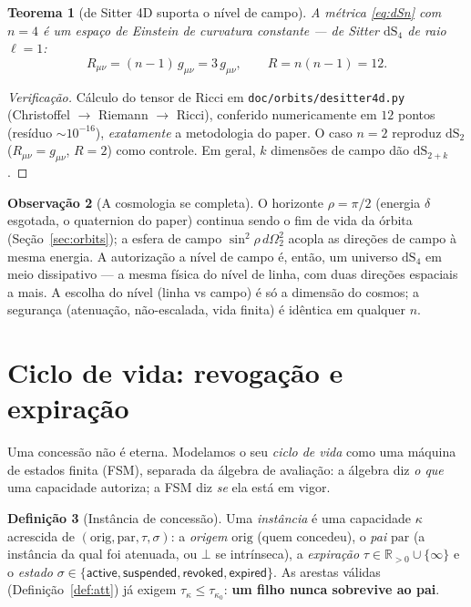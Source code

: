 \documentclass[11pt,a4paper]{article}
\newtheorem{theorem}{Teorema}
\theoremstyle{definition}
\newtheorem{definition}[theorem]{Definição}
\newtheorem{remark}[theorem]{Observação}
\newcommand{\dep}{\delta}
\newcommand{\dS}{\mathrm{dS}}
\begin{document}
\begin{theorem}[de Sitter 4D suporta o nível de campo]\label{thm:dS4}
A métrica \eqref{eq:dSn} com $n=4$ é um espaço de Einstein de curvatura
constante --- de Sitter $\dS_4$ de raio $\ell=1$:
\[
  R_{\mu\nu}=(n-1)\,g_{\mu\nu}=3\,g_{\mu\nu},\qquad R=n(n-1)=12.
\]
\end{theorem}
\begin{proof}[Verificação]
Cálculo do tensor de Ricci em \texttt{doc/orbits/desitter4d.py} (Christoffel
$\to$ Riemann $\to$ Ricci), conferido numericamente em $12$ pontos (resíduo
$\sim10^{-16}$), \emph{exatamente} a metodologia do paper. O caso $n=2$
reproduz $\dS_2$ ($R_{\mu\nu}=g_{\mu\nu}$, $R=2$) como controle. Em geral,
$k$ dimensões de campo dão $\dS_{2+k}$.
\end{proof}

\begin{remark}[A cosmologia se completa]
O horizonte $\rho=\pi/2$ (energia $\dep$ esgotada, o quaternion do paper)
continua sendo o fim de vida da órbita (Seção~\ref{sec:orbits}); a esfera de
campo $\sin^2\!\rho\,d\Omega^2_2$ acopla as direções de campo à mesma energia.
A autorização a nível de campo é, então, um universo $\dS_4$ em meio
dissipativo --- a mesma física do nível de linha, com duas direções
espaciais a mais. A escolha do nível (linha vs campo) é só a dimensão do
cosmos; a segurança (atenuação, não-escalada, vida finita) é idêntica em
qualquer $n$.
\end{remark}

\section{Ciclo de vida: revogação e expiração}\label{sec:lifecycle}

Uma concessão não é eterna. Modelamos o seu \emph{ciclo de vida} como uma
máquina de estados finita (FSM), separada da álgebra de avaliação: a álgebra
diz \emph{o que} uma capacidade autoriza; a FSM diz \emph{se} ela está em
vigor.

\begin{definition}[Instância de concessão]
Uma \emph{instância} é uma capacidade $\kappa$ acrescida de
$(\mathrm{orig},\mathrm{par},\tau,\sigma)$: a \emph{origem} $\mathrm{orig}$
(quem concedeu), o \emph{pai} $\mathrm{par}$ (a instância da qual foi
atenuada, ou $\bot$ se intrínseca), a \emph{expiração}
$\tau\in\mathbb{R}_{>0}\cup\{\infty\}$ e o \emph{estado}
$\sigma\in\{\textsf{active},\textsf{suspended},\textsf{revoked},
\textsf{expired}\}$. As arestas válidas (Definição~\ref{def:att}) já exigem
$\tau_\kappa\le\tau_{\kappa_0}$: \textbf{um filho nunca sobrevive ao pai}.
\end{definition}
\end{document}

